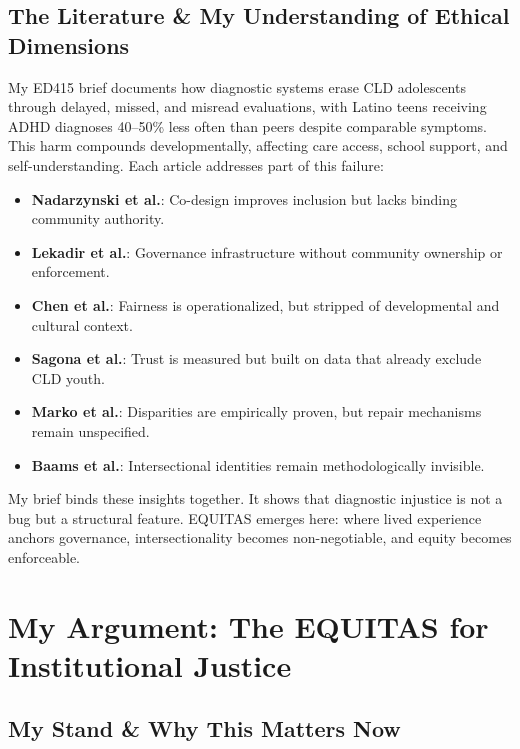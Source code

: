 \documentclass[12pt,a4paper]{article}
\begin{document}
\subsection{The Literature \& My Understanding of Ethical Dimensions}
My ED415 brief documents how diagnostic systems erase CLD adolescents through delayed, missed, and misread evaluations, with Latino teens receiving ADHD diagnoses 40–50\% less often than peers despite comparable symptoms. This harm compounds developmentally, affecting care access, school support, and self-understanding. Each article addresses part of this failure:
\begin{itemize}
    \setlength\itemsep{0.1em}
    \item \textbf{Nadarzynski et al.}: Co-design improves inclusion but lacks binding community authority.
    \item \textbf{Lekadir et al.}: Governance infrastructure without community ownership or enforcement.
    \item \textbf{Chen et al.}: Fairness is operationalized, but stripped of developmental and cultural context.
    \item \textbf{Sagona et al.}: Trust is measured but built on data that already exclude CLD youth.
    \item \textbf{Marko et al.}: Disparities are empirically proven, but repair mechanisms remain unspecified.
    \item \textbf{Baams et al.}: Intersectional identities remain methodologically invisible.
\end{itemize}

My brief binds these insights together. It shows that diagnostic injustice is not a bug but a structural feature. EQUITAS emerges here: where lived experience anchors governance, intersectionality becomes non-negotiable, and equity becomes enforceable.





\newpage
\section{My Argument: The EQUITAS for Institutional Justice}

\subsection{My Stand \& Why This Matters Now}
\end{document}

